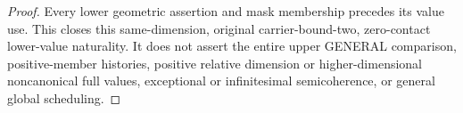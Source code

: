\begin{proof}
Every lower geometric assertion and mask membership precedes its value
use. This closes this same-dimension, original carrier-bound-two,
zero-contact lower-value naturality. It does not assert the entire upper
GENERAL comparison, positive-member histories, positive relative
dimension or higher-dimensional noncanonical full values, exceptional
or infinitesimal semicoherence, or general global scheduling.
\end{proof}
